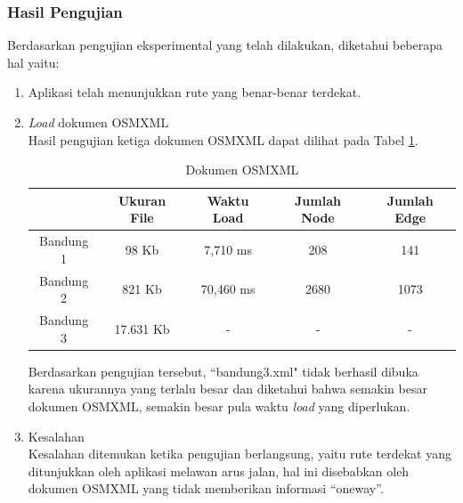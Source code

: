\subsubsection{Hasil Pengujian}
Berdasarkan pengujian eksperimental yang telah dilakukan, diketahui beberapa hal
yaitu:
\begin{enumerate}
  \item Aplikasi telah menunjukkan rute yang benar-benar terdekat.
  
  \item \textit{Load} dokumen OSMXML\\
  Hasil pengujian ketiga dokumen OSMXML dapat dilihat pada Tabel
  \ref{tab:doc_xml}.
\begin{table}[h]
\centering
\caption{Dokumen OSMXML} 
\label{tab:doc_xml}
\begin{tabular}{|c|c|c|c|c|}
\hline
          & Ukuran File & Waktu Load & Jumlah Node & Jumlah Edge \\ \hline
Bandung 1 & 98 Kb       & 7,710 ms   & 208         & 141         \\ \hline
Bandung 2 & 821 Kb      & 70,460 ms  & 2680        & 1073        \\ \hline
Bandung 3 & 17.631 Kb   & -          & -           & -           \\ \hline
\end{tabular}
\end{table}

  Berdasarkan pengujian tersebut, ``bandung3.xml" tidak berhasil dibuka
  karena ukurannya yang terlalu besar dan diketahui bahwa semakin besar dokumen
  OSMXML, semakin besar pula waktu \textit{load} yang diperlukan.
  
  \item Kesalahan\\
  Kesalahan ditemukan ketika pengujian berlangsung, yaitu rute terdekat yang
  ditunjukkan oleh aplikasi melawan arus jalan, hal ini disebabkan oleh dokumen
  OSMXML yang tidak memberikan informasi ``oneway''.
\end{enumerate}











